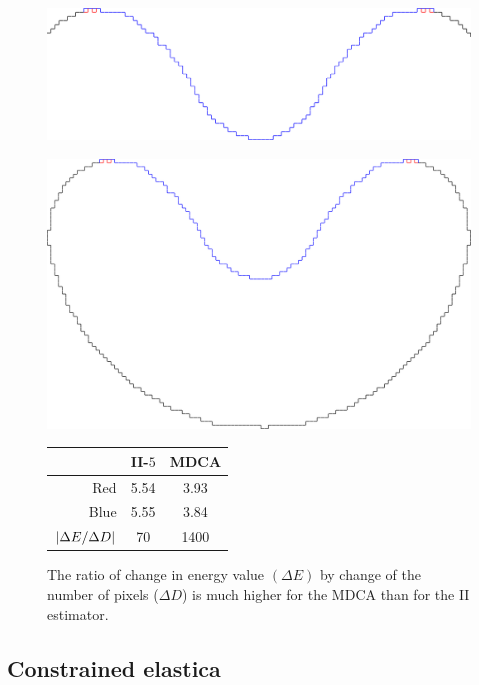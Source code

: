 \begin{figure}[]
\begin{minipage}[b]{0.6\textwidth}
\center
\includegraphics[scale=0.15]{figures/chapter5/mdca-sensitivity/closer-picture.pdf}
\end{minipage}%
\begin{minipage}[b]{0.4\textwidth}
\center
\includegraphics[scale=0.025]{figures/chapter5/mdca-sensitivity/big-picture.pdf}\\\vspace{2em}
\captionsetup{type=table}
\begin{tabular}{r|c|c}
& II-$5$ & MDCA \\
\hline
Red  & 5.54 & 3.93\\
Blue & 5.55 & 3.84\\
\hline
$| \Delta E / \Delta D |$ & 70 & 1400
\end{tabular}
\end{minipage}
\caption{ The ratio of change in energy value $(\Delta E)$ by change of the number of pixels ($\Delta D$) is much higher for the MDCA than for the II estimator. }
\label{fig:mdca-sensitivity}
\end{figure}

\subsection{Constrained elastica}
\label{ch5:subsec:constrained-digital-elastica}

